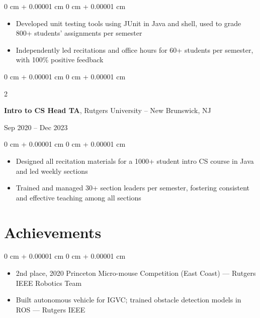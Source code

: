 \documentclass[10pt, letterpaper]{article}
\newenvironment{highlights}{
    \begin{itemize}[
        topsep=0.05 cm,
        parsep=0.05 cm,
        partopsep=0pt,
        itemsep=0pt,
        leftmargin=0 cm + 10pt
    ]
}{
    \end{itemize}
} %
\newenvironment{highlightsforbulletentries}{
    \begin{itemize}[
        topsep=0.10 cm,
        parsep=0.10 cm,
        partopsep=0pt,
        itemsep=0pt,
        leftmargin=10pt
    ]
}{
    \end{itemize}
} %
\newenvironment{onecolentry}{
    \begin{adjustwidth}{
        0 cm + 0.00001 cm
    }{
        0 cm + 0.00001 cm
    }
}{
    \end{adjustwidth}
} %
\newenvironment{twocolentry}[2][]{
    \onecolentry
    \def\secondColumn{#2}
    \setcolumnwidth{\fill, 4.5 cm}
    \begin{paracol}{2}
}{
    \switchcolumn \raggedleft \secondColumn
    \end{paracol}
    \endonecolentry
} %
\begin{document}
        \vspace{0.10 cm}
        \begin{onecolentry}
            \begin{highlights}
                \item Developed unit testing tools using JUnit in Java and shell, used to grade 800+ students' assignments per semester
                \item Independently led recitations and office hours for 60+ students per semester, with 100\% positive feedback
            \end{highlights}
        \end{onecolentry}

        \vspace{0.2 cm}

        \begin{twocolentry}
            {Sep 2020 – Dec 2023}
            \textbf{Intro to CS Head TA}, Rutgers University -- New Brunswick, NJ
        \end{twocolentry}

        \vspace{0.10 cm}
        \begin{onecolentry}
            \begin{highlights}
                \item Designed all recitation materials for a 1000+ student intro CS course in Java and led weekly sections
                \item Trained and managed 30+ section leaders per semester, fostering consistent and effective teaching among all sections
            \end{highlights}
        \end{onecolentry}
    
    \section{Achievements}
        \begin{onecolentry}
            \begin{highlightsforbulletentries}
                \item 2nd place, 2020 Princeton Micro-mouse Competition (East Coast) — Rutgers IEEE Robotics Team
                \item Built autonomous vehicle for IGVC; trained obstacle detection models in ROS — Rutgers IEEE
            \end{highlightsforbulletentries}
        \end{onecolentry}
        
        
\end{document}
